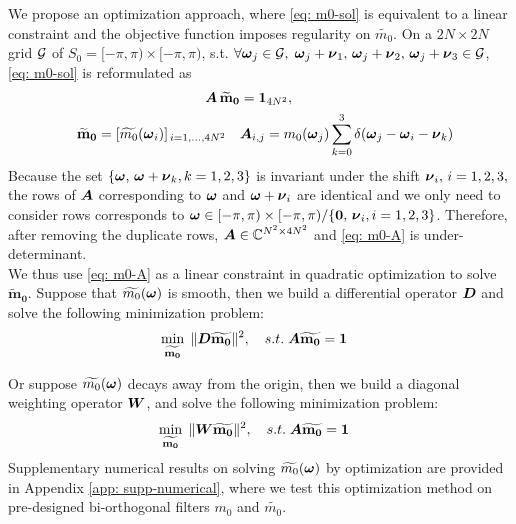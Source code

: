 We propose an optimization approach, where \eqref{eq: m0-sol} is equivalent to a linear constraint and the objective function imposes regularity on $\widetilde{m_0}$.
On a $2N\times 2N$ grid $\mathcal{G}$ of $S_0 = [-\pi, \pi)\times[-\pi, \pi)$, s.t. $\forall \boldsymbol{\omega}_j \in \mathcal{G}, \; \boldsymbol{\omega}_j+\boldsymbol{\nu}_1,\,\boldsymbol{\omega}_j+\boldsymbol{\nu}_2,\,\boldsymbol{\omega}_j+\boldsymbol{\nu}_3 \in \mathcal{G}$, \eqref{eq: m0-sol} is reformulated as
\begin{align}
\hspace*{10em} \V{A}\, \mathbf{\widetilde{m}_0}&= \mathbf{1}_{4N^2}, \label{eq: m0-A}\\ 
\mathbf{\widetilde{m}_0} = [\widetilde{m_0}(\V{\omega}_i)]_{\,i=1,\hdots,4N^2} \quad &\V{A}_{i,j} = m_0(\V{\omega}_j)\sum_{k=0}^3\delta(\V{\omega}_j-\V{\omega}_i-\V{\nu}_k) \notag
\end{align}
Because the set $\{\boldsymbol{\omega},\, \boldsymbol{\omega}+\boldsymbol{\nu}_k,k=1,2,3\}$ is invariant under the shift $\boldsymbol{\nu}_i,\, i = 1,2,3,$ the rows of $\boldsymbol{A}$ corresponding to $\boldsymbol{\omega}$ and $\boldsymbol{\omega}+\boldsymbol{\nu}_i$ are identical and we only need to consider rows corresponds to $\boldsymbol{\omega}\in [-\pi,\pi)\times[-\pi,\pi)/\{\boldsymbol{0},\,\boldsymbol{\nu}_i,i=1,2,3\}$. Therefore, after removing the duplicate rows, $\boldsymbol{A}\in \mathbb{C}^{N^2\times 4N^2}$ and \eqref{eq: m0-A} is under-determinant. \\
We thus use \eqref{eq: m0-A} as a linear constraint in quadratic optimization to solve $\mathbf{\widetilde{m}_0}$. Suppose that $\widetilde{m_{0}}(\boldsymbol{\omega})$ is smooth, then we build a differential operator $\boldsymbol{D}$ and solve the following minimization problem:
\begin{align}
&\min_{\mathbf{\widetilde{m_{0}}}}\; \Vert \boldsymbol{D}\mathbf{\widetilde{m_{0}}}\Vert^2,\quad s.t. \; \boldsymbol{A}\mathbf{\widetilde{m_{0}}} = \mathbf{1} \label{eq: opt-diff}
\end{align}

Or suppose $\widetilde{m_{0}}(\boldsymbol{\omega})$ decays away from the origin, then we build a diagonal weighting operator $\boldsymbol{W}$, and solve the following minimization problem:
\begin{align}\label{eq: opt-weight}
&\min_{\mathbf{\widetilde{m_{0}}}}\; \Vert \boldsymbol{W}\mathbf{\widetilde{m_{0}}}\Vert^2,\quad s.t. \; \boldsymbol{A}\mathbf{\widetilde{m_{0}}} = \mathbf{1}
\end{align}
Supplementary numerical results on solving $\widetilde{m_{0}}(\boldsymbol{\omega})$ by optimization are provided in Appendix \ref{app: supp-numerical}, where we test this optimization method on pre-designed bi-orthogonal filters $m_0$ and $\widetilde{m_0}$.

